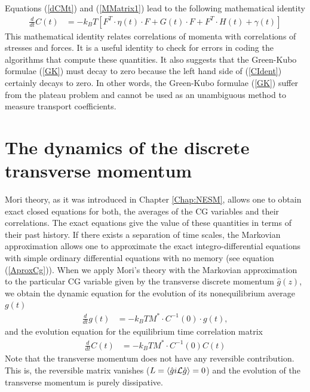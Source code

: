 \documentclass[b5paper,openright,10pt]{book}
\newcommand{\esc}{\!\cdot\!}
\newcommand{\llangle}{\left\langle}
\newcommand{\rrangle}{\right\rangle}
\begin{document}
Equations  (\ref{dCMt}) and (\ref{MMatrix1}) lead to the following mathematical identity
\begin{align}
  \frac{d}{dt}C(t)&=-k_BT\left[{F}^T\esc{\eta}(t)\esc{F}+{G}(t)\esc{F}+{F}^T\esc{H}(t)+{\gamma}(t)\right]
\label{CIdent}
\end{align}
This mathematical  identity relates correlations of  momenta with correlations of stresses
and forces. It is a useful identity  to check for errors in coding the
algorithms that  compute these quantities.  It also suggests  that the
Green-Kubo formulae  (\ref{GK}) must  decay to  zero because  the left
hand side of (\ref{CIdent}) certainly decays to zero.  In other words,
the Green-Kubo formulae (\ref{GK}) suffer from the plateau problem and
cannot  be  used  as  an   unambiguous  method  to  measure  transport
coefficients.


\section{The dynamics of the discrete transverse momentum}
\label{Sec:dyn}
Mori theory, as it was introduced in Chapter \ref{Chap:NESM}, allows one to obtain
exact closed equations for both, the  averages of the CG variables and
their  correlations.  The  exact  equations give  the  value of  these
quantities  in  terms  of  their  past history.   If  there  exists  a
separation of time  scales, the Markovian approximation  allows one to
approximate  the  exact  integro-differential  equations  with  simple
ordinary differential equations with no  memory (see equation (\ref{AproxCg})).  When we apply Mori's
theory with the Markovian approximation  to the particular CG variable
given by the transverse discrete  momentum $\hat{g}(z)$, we obtain the
dynamic  equation for  the  evolution of  its nonequilibrium  average
$g(t)$
\begin{align}
 \frac{d}{dt}g(t)&= -k_BT M^*\esc C^{-1}(0) \esc g(t), 
\label{InFull}
\end{align}
and the evolution equation for the equilibrium time correlation matrix
 \begin{align}
 \frac{d}{dt}C(t)&= -k_BT M^*\esc C^{-1}(0)C(t)
\label{InFull-C-2}
\end{align}
Note  that the  transverse momentum
does not  have any reversible  contribution.  This is,  the reversible
matrix  
vanishes ($L=\llangle \hat{g}  i{\cal  L}\hat{g}\rrangle=0$) and  the
evolution of the transverse momentum is purely dissipative.
\end{document}
